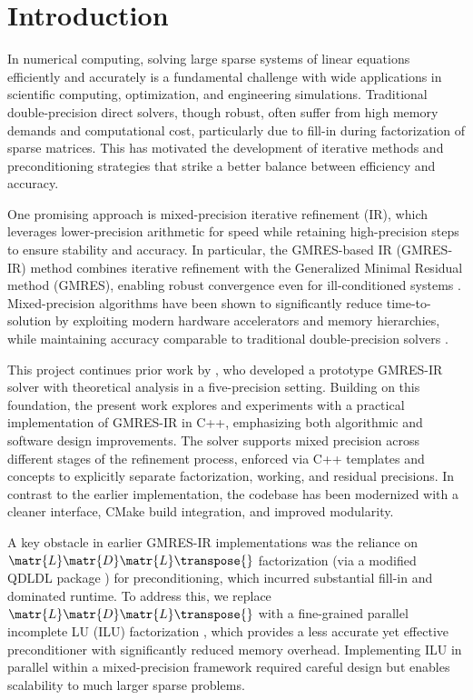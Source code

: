 \chapter{Introduction}
\label{cha:introduction}

In numerical computing, solving large sparse systems of linear equations
efficiently and accurately is a fundamental challenge with wide applications in
scientific computing, optimization, and engineering simulations. Traditional
double-precision direct solvers, though robust, often suffer from high memory
demands and computational cost, particularly due to fill-in during factorization
of sparse matrices. This has motivated the development of iterative methods and
preconditioning strategies that strike a better balance between efficiency and
accuracy.

One promising approach is mixed-precision iterative refinement (IR), which
leverages lower-precision arithmetic for speed while retaining high-precision
steps to ensure stability and accuracy. In particular, the GMRES-based IR
(GMRES-IR) method combines iterative refinement with the Generalized Minimal
Residual method (GMRES), enabling robust convergence even for ill-conditioned
systems \cite{lindquist_improving_2020,mary_mixed_2023}. Mixed-precision
algorithms have been shown to significantly reduce time-to-solution by
exploiting modern hardware accelerators and memory hierarchies, while
maintaining accuracy comparable to traditional double-precision solvers
\cite{mary_mixed_2023}.

This project continues prior work by \textcite{wong_exploring_2024}, who developed
a prototype GMRES-IR solver with theoretical analysis in a five-precision
setting. Building on this foundation, the present work explores and experiments
with a practical implementation of GMRES-IR in C++, emphasizing both algorithmic
and software design improvements. The solver supports mixed precision across
different stages of the refinement process, enforced via C++ templates and
concepts to explicitly separate factorization, working, and residual precisions.
In contrast to the earlier implementation, the codebase has been modernized with
a cleaner interface, CMake build integration, and improved modularity.

A key obstacle in earlier GMRES-IR implementations was the reliance on
\(\matr{L} \matr{D} \matr{L}\transpose{}\) factorization (via a modified QDLDL
package \cite{shahrooz_derakhshan_using_2023}) for preconditioning, which
incurred substantial fill-in and dominated runtime. To address this, we replace
\(\matr{L} \matr{D} \matr{L}\transpose{}\) with a fine-grained parallel
incomplete LU (ILU) factorization \cite{chow_fine-grained_2015}, which provides
a less accurate yet effective preconditioner with significantly reduced memory
overhead. Implementing ILU in parallel within a mixed-precision framework
required careful design but enables scalability to much larger sparse problems.

